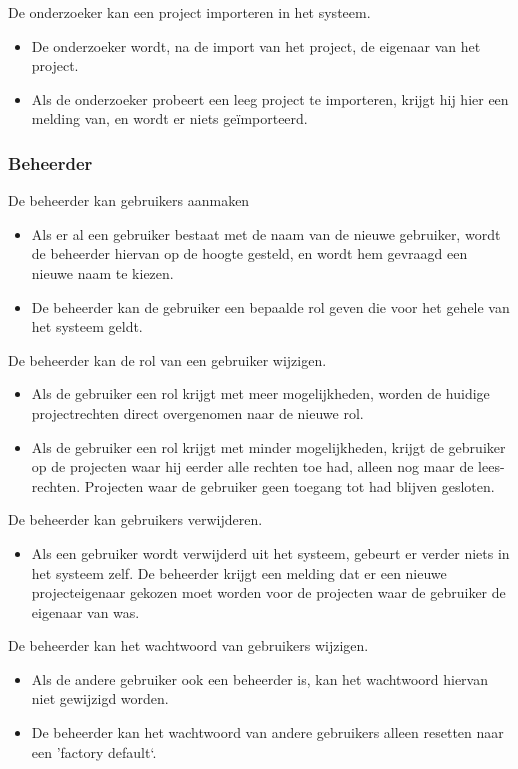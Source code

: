 De onderzoeker kan een project importeren in het systeem.
\begin{itemize}
	\item De onderzoeker wordt, na de import van het project, de eigenaar van het project.
	\item Als de onderzoeker probeert een leeg project te importeren, krijgt hij hier een melding van, en wordt er niets ge\"importeerd.
\end{itemize}

\subsubsection{Beheerder}

De beheerder kan gebruikers aanmaken
\begin{itemize}
	\item Als er al een gebruiker bestaat met de naam van de nieuwe gebruiker, wordt de beheerder hiervan op de hoogte gesteld, en wordt hem gevraagd een nieuwe naam te kiezen.
	\item De beheerder kan de gebruiker een bepaalde rol geven die voor het gehele van het systeem geldt.
\end{itemize}

De beheerder kan de rol van een gebruiker wijzigen.
\begin{itemize}
	\item Als de gebruiker een rol krijgt met meer mogelijkheden, worden de huidige projectrechten direct overgenomen naar de nieuwe rol.
	\item Als de gebruiker een rol krijgt met minder mogelijkheden, krijgt de gebruiker op de projecten waar hij eerder alle rechten toe had, alleen nog maar de lees-rechten. Projecten waar de gebruiker geen toegang tot had blijven gesloten.
\end{itemize}

De beheerder kan gebruikers verwijderen.
\begin{itemize}
	\item Als een gebruiker wordt verwijderd uit het systeem, gebeurt er verder niets in het systeem zelf. De beheerder krijgt een melding dat er een nieuwe projecteigenaar gekozen moet worden voor de projecten waar de gebruiker de eigenaar van was.
\end{itemize}

De beheerder kan het wachtwoord van gebruikers wijzigen.
\begin{itemize}
	\item Als de andere gebruiker ook een beheerder is, kan het wachtwoord hiervan niet gewijzigd worden.
	\item De beheerder kan het wachtwoord van andere gebruikers alleen resetten naar een 'factory default`.
\end{itemize}